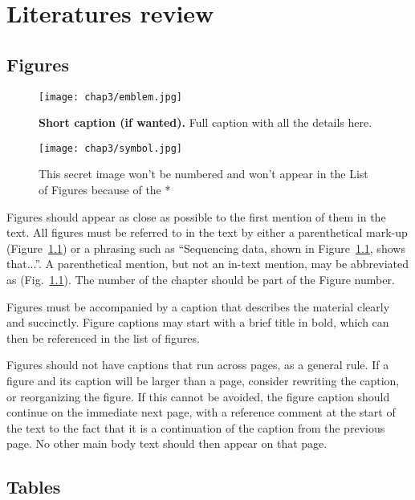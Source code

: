 

\chapter{Literatures review} \label{chap-3}

\section{Figures}

\begin{figure}
\center
\texttt{[image: chap3/emblem.jpg]} 
\caption[Short caption for List of Figures]{{\bfseries Short caption (if wanted).} Full caption with all the details here.}
\label{fig-example}
\end{figure}

\begin{figure}
\center
\texttt{[image: chap3/symbol.jpg]} 
\caption*{This secret image won't be numbered and won't appear in the List of Figures because of the *}
\end{figure}

Figures should appear as close as possible to the first mention of them in the text. All figures must be referred to in the text by either a parenthetical mark-up (Figure~\ref{fig-example}) or a phrasing such as ``Sequencing data, shown in Figure~\ref{fig-example}, shows that...''.  A parenthetical mention, but not an in-text mention, may be abbreviated as (Fig.~\ref{fig-example}).  The number of the chapter should be part of the Figure number.

Figures must be accompanied by a caption that describes the material clearly and succinctly. Figure captions may start with a brief title in bold, which can then be referenced in the list of figures. 

Figures should not have captions that run across pages, as a general rule. If a figure and its caption will be larger than a page, consider rewriting the caption, or reorganizing the figure.  If this cannot be avoided, the figure caption should continue on the immediate next page, with a reference comment at the start of the text to the fact that it is a continuation of the caption from the previous page.  No other main body text should then appear on that page.

\section{Tables}

